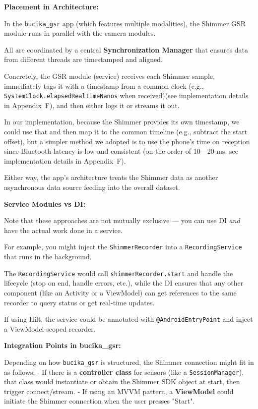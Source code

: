 {{\textbf{Placement in Architecture:}

In the \texttt{bucika_gsr} app (which features multiple modalities), the Shimmer GSR module runs in parallel with the camera modules.

All are coordinated by a central \textbf{Synchronization Manager}
 that ensures data from different threads are timestamped and aligned.

Concretely, the GSR module (service) receives each Shimmer sample, immediately tags it with a timestamp from a common clock (e.g., \texttt{SystemClock.elapsedRealtimeNanos} when received)(see implementation details in Appendix~F), and then either logs it or streams it out.

In our implementation, because the Shimmer provides its own timestamp, we could use that and then map it to the common timeline (e.g., subtract the start offset), but a simpler method we adopted is to use the phone's time on reception since Bluetooth latency is low and consistent (on the order of 10---20 ms; see implementation details in Appendix~F).

Either way, the app's architecture treats the Shimmer data as another asynchronous data source feeding into the overall dataset.

\textbf{Service Modules vs DI:}

Note that these approaches are not mutually exclusive --- you can use DI \textit{and} have the actual work done in a service.

For example, you might inject the \texttt{ShimmerRecorder} into a \texttt{RecordingService} that runs in the background.

The \texttt{RecordingService} would call \texttt{shimmerRecorder.start} and handle the lifecycle (stop on end, handle errors, etc.), while the DI ensures that any other component (like an Activity or a ViewModel) can get references to the same recorder to query status or get real-time updates.

If using Hilt, the service could be annotated with \texttt{@AndroidEntryPoint} and inject a ViewModel-scoped recorder.

\textbf{Integration Points in bucika_gsr:}

Depending on how \texttt{bucika_gsr} is structured, the Shimmer connection might fit in as follows: - If there is a \textbf{controller class}
 for sensors (like a \texttt{SessionManager}), that class would instantiate or obtain the Shimmer SDK object at start, then trigger connect/stream. - If using an MVVM pattern, a \textbf{ViewModel}
 could initiate the Shimmer connection when the user presses "Start".

}}
